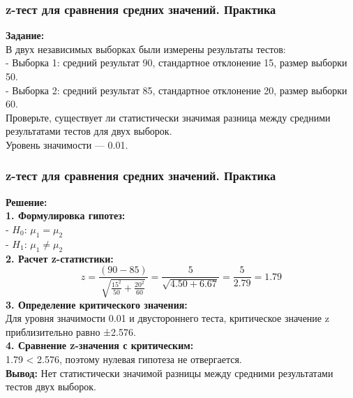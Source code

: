 \documentclass[aspectratio=169]{beamer}
\begin{document}
\begin{frame}
\frametitle{z-тест для сравнения средних значений. Практика}
{\bf Задание:}\\
В двух независимых выборках были измерены результаты тестов:\\
- Выборка 1: средний результат 90, стандартное отклонение 15, размер выборки 50.\\
- Выборка 2: средний результат 85, стандартное отклонение 20, размер выборки 60.\\
Проверьте, существует ли статистически значимая разница между средними результатами тестов для двух выборок.\\
Уровень значимости — 0.01.
\end{frame}

\begin{frame}
\frametitle{z-тест для сравнения средних значений. Практика}
{\bf Решение:}\\
{\bf 1. Формулировка гипотез:}\\
- $H_0$: \( \mu_1 = \mu_2 \)\\
- $H_1$: \( \mu_1 \ne \mu_2 \)\\
{\bf 2. Расчет z-статистики:}\\
   \[
   z = \frac{(90 - 85)}{\sqrt{\frac{15^2}{50} + \frac{20^2}{60}}} = \frac{5}{\sqrt{4.50 + 6.67}} = \frac{5}{2.79} = 1.79
   \]
{\bf 3. Определение критического значения:}\\
Для уровня значимости 0.01 и двустороннего теста, критическое значение z приблизительно равно ±2.576.\\
{\bf 4. Сравнение z-значения с критическим:}\\
1.79 < 2.576, поэтому нулевая гипотеза не отвергается.\\
{\bf Вывод:} Нет статистически значимой разницы между средними результатами тестов двух выборок.
\end{frame}
\end{document}
